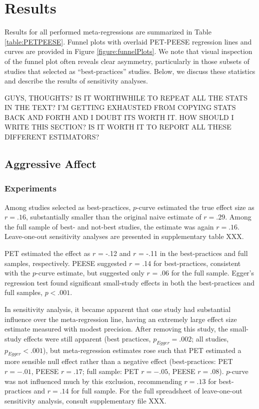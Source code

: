 \documentclass[man]{apa6}
\begin{document}
\section{Results}
Results for all performed meta-regressions are summarized in Table \ref{table:PETPEESE}. 
Funnel plots with overlaid PET-PEESE regression lines and curves are provided in Figure \ref{figure:funnelPlots}. We note that visual inspection of the funnel plot often reveals clear asymmetry, particularly in those subsets of studies that \citet{Anderson:etal:2010} selected as ``best-practices'' studies.
Below, we discuss these statistics and describe the results of sensitivity analyses.

GUYS, THOUGHTS? IS IT WORTHWHILE TO REPEAT ALL THE STATS IN THE TEXT? I'M GETTING EXHAUSTED FROM COPYING STATS BACK AND FORTH AND I DOUBT ITS WORTH IT. HOW SHOULD I WRITE THIS SECTION? IS IT WORTH IT TO REPORT ALL THESE DIFFERENT ESTIMATORS?

\subsection{Aggressive Affect}
\subsubsection{Experiments}
Among studies selected as best-practices, $p$-curve estimated the true effect size as $r = .16$, substantially smaller than the original naive estimate of $r = .29$. Among the full sample of best- and not-best studies, the estimate was again $r = .16$. Leave-one-out sensitivity analyses are presented in supplementary table XXX. 

PET estimated the effect as $r$ = -.12 and $r$ = -.11 in the best-practices and full samples, respectively. PEESE suggested $r$ = .14 for best-practices, consistent with the $p$-curve estimate, but suggested only $r$ = .06 for the full sample. Egger's regression test found significant small-study effects in both the best-practices and full samples, $p < .001$.

In sensitivity analysis, it became apparent that one study \citep{Ballard:Weist:1996} had substantial influence over the meta-regression line, having an extremely large effect size estimate measured with modest precision. After removing this study, the small-study effects were still apparent (best practices, $p_{Egger} = .002$; all studies, $p_{Egger} < .001$), but meta-regression estimates rose such that PET estimated a more sensible null effect rather than a negative effect (best-practices: PET $r = -.01$, PEESE $r = .17$; full sample: PET $r = -.05$, PEESE $r = .08$). $p$-curve was not influenced much by this exclusion, recommending $r = .13$ for best-practices and $r = .14$ for full sample. For the full spreadsheet of leave-one-out sensitivity analysis, consult supplementary file XXX.
\end{document}
